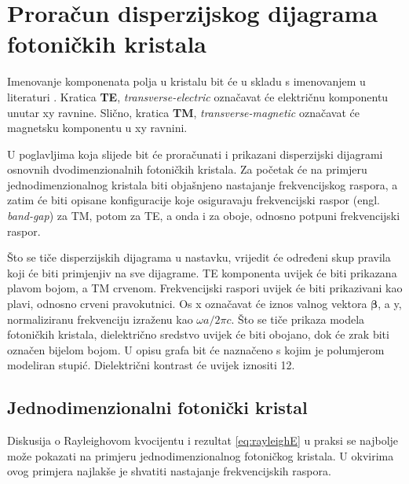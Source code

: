 \documentclass[utf8, seminar]{fer}
\begin{document}
\chapter{Proračun disperzijskog dijagrama fotoničkih kristala}

Imenovanje komponenata polja u kristalu bit će u skladu s imenovanjem u
literaturi \cite{joannopoulos2011photonic}. Kratica \textbf{TE},
\textit{transverse-electric} označavat će električnu komponentu unutar xy ravnine.
Slično, kratica \textbf{TM}, \textit{transverse-magnetic} označavat će magnetsku
komponentu u xy ravnini.

U poglavljima koja slijede bit će proračunati i prikazani disperzijski dijagrami
osnovnih dvodimenzionalnih fotoničkih kristala. Za početak će na primjeru
jednodimenzionalnog kristala biti objašnjeno nastajanje frekvencijskog raspora, a
zatim će biti opisane konfiguracije koje osiguravaju frekvencijski raspor (engl.
\textit{band-gap}) za TM, potom za TE, a onda i za oboje, odnosno potpuni
frekvencijski raspor.

Što se tiče disperzijskih dijagrama u nastavku, vrijedit će određeni skup pravila
koji će biti primjenjiv na sve dijagrame. TE komponenta uvijek će biti prikazana
plavom bojom, a TM crvenom. Frekvencijski raspori uvijek će biti prikazivani kao
plavi, odnosno crveni pravokutnici. Os x označavat će iznos valnog vektora
${\bm{\beta}}$, a y, normaliziranu frekvenciju izraženu kao
${\omega a/ 2 \pi c}$. Što se tiče prikaza modela fotoničkih kristala,
dielektrično sredstvo uvijek će biti obojano, dok će zrak biti označen bijelom
bojom. U opisu grafa bit će naznačeno s kojim je polumjerom modeliran stupić.
Dielektrični kontrast će uvijek iznositi 12.

\newpage

\section{Jednodimenzionalni fotonički kristal}

Diskusija o Rayleighovom kvocijentu i rezultat \ref{eq:rayleighE} u praksi se
najbolje može pokazati na primjeru jednodimenzionalnog fotoničkog kristala.
U okvirima ovog primjera najlakše je shvatiti nastajanje frekvencijskih raspora.
\end{document}
